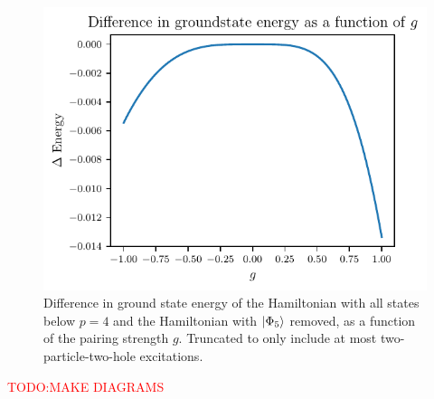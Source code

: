 \begin{figure}[htbp]
    \centering
    \includegraphics{figures/c_diff_ground_state_energy.pdf}
    \caption{
        Difference in ground state energy of the Hamiltonian with all states below $p=4$ and the Hamiltonian with $\lvert\Phi_5\rangle$ removed, as a function of the pairing strength $g$.
        Truncated to only include at most two-particle-two-hole excitations.\label{fig:c_diff_groundstate}
    }
\end{figure}


\textcolor{red}{TODO:\@ MAKE DIAGRAMS}
